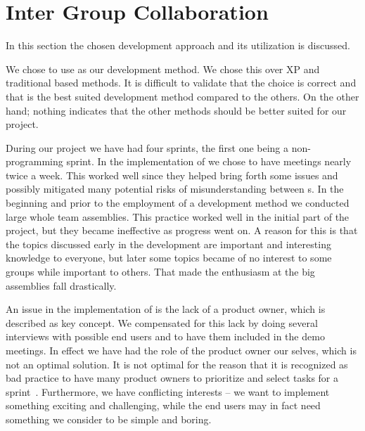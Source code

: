 \section{Inter Group Collaboration}
\label{sec:intergroup}
In this section the chosen development approach and its utilization is discussed.

We chose to use \sos{} as our development method.
We chose this over XP and traditional based methods.
It is difficult to validate that the choice is correct and that \sos{} is the best suited development method compared to the others.
On the other hand; nothing indicates that the other methods should be better suited for our project. 

During our project we have had four sprints, the first one being a non-programming sprint.
In the implementation of \sos{} we chose to have \sos{} meetings nearly twice a week.
This worked well since they helped bring forth some issues and possibly mitigated many potential risks of misunderstanding between \subgroup{}s.
In the beginning and prior to the employment of a development method we conducted large whole team assemblies. 
This practice worked well in the initial part of the project, but they became ineffective as progress went on. 
A reason for this is that the topics discussed early in the development are important and interesting knowledge to everyone, but later some topics became of no interest to some groups while important to others.
That made the enthusiasm at the big assemblies fall drastically. 


An issue in the implementation of \sos{} is the lack of a product owner, which is described as key concept. 
We compensated for this lack by doing several interviews with possible end users and to have them included in the demo meetings. 
In effect we have had the role of the product owner our selves, which is not an optimal solution. 
It is not optimal for the reason that it is recognized as bad \scrum{} practice to have many product owners to prioritize and select tasks for a sprint~\cite[p.~128]{Larman04}. 
Furthermore, we have conflicting interests -- we want to implement something exciting and challenging, while the end users may in fact need something we consider to be simple and boring.


